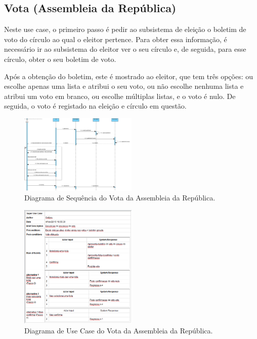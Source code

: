 \documentclass[a4paper,12pt]{report}
\begin{document}
\newpage
\subsection{Vota (Assembleia da República)}
Neste use case, o primeiro passo é pedir ao subsistema de eleição o boletim de voto do círculo ao qual o eleitor pertence. Para obter essa informação, é necessário ir ao subsistema do eleitor ver o seu círculo e, de seguida, para esse círculo, obter o seu boletim de voto.

Após a obtenção do boletim, este é mostrado ao eleitor, que tem três opções: ou escolhe apenas uma lista e atribui o seu voto, ou não escolhe nenhuma lista e atribui um voto em branco, ou escolhe múltiplas listas, e o voto é nulo. De seguida, o voto é registado na eleição e círculo em questão.

\begin{figure}[h]
\begin{center}
	\includegraphics[width=0.5\textwidth]{media/usecase_dss/ar_vota.png}
	 \caption{Diagrama de Sequência do Vota da Assembleia da República.}
\end{center}
\end{figure}

\begin{figure}[h]
\begin{center}
	\includegraphics[width=0.5\textwidth]{media/usecase_dss/uc_vota.PNG}
	 \caption{Diagrama de Use Case do Vota da Assembleia da República.}
\end{center}
\end{figure}
\end{document}
